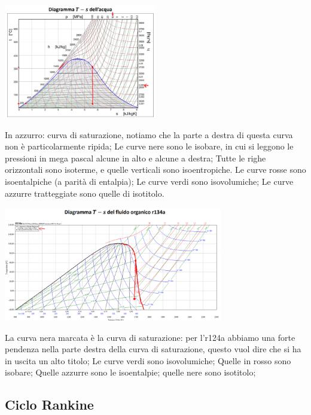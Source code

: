 \begin{center}
    \includegraphics[height=5cm]{../L08/img3.PNG}
\end{center}
In azzurro: curva di saturazione, notiamo che la parte a destra di questa curva non è particolarmente ripida;\newline
Le curve nere sono le isobare, in cui si leggono le pressioni in mega pascal alcune in alto e alcune a destra;\newline
Tutte le righe orizzontali sono isoterme, e quelle verticali sono isoentropiche.\newline
Le curve rosse sono isoentalpiche (a parità di entalpia); \newline
Le curve verdi sono isovolumiche;\newline
Le curve azzurre tratteggiate sono quelle di isotitolo.
\begin{center}
    \includegraphics[height=5cm]{../L08/img4.PNG}
\end{center}
La curva nera marcata è la curva di saturazione: per l'r124a abbiamo una forte pendenza nella parte destra della curva di saturazione, questo vuol dire che si ha in uscita un alto titolo;\newline
Le curve verdi sono isovolumiche;\newline
Quelle in rosso sono isobare;\newline
Quelle azzurre sono le isoentalpie;\newline
quelle nere sono isotitolo;
\subsection{Ciclo Rankine}
